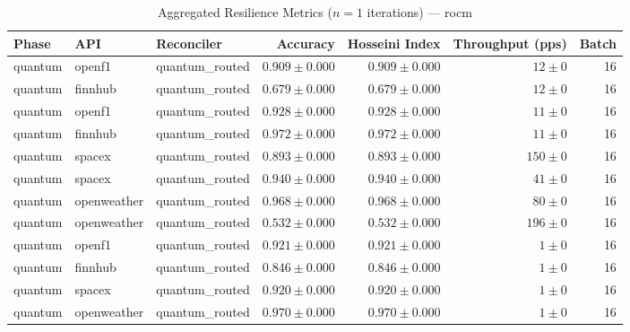 
\begin{table}[htbp]
\caption{Aggregated Resilience Metrics ($n=1$ iterations) --- rocm}
\begin{tabular}{l l l r r r r}
\hline
Phase & API & Reconciler & Accuracy & Hosseini Index & Throughput (pps) & Batch \\
\hline
quantum & openf1 & quantum\_routed & $0.909\pm0.000$ & $0.909\pm0.000$ & $12\pm0$ & 16 \\
quantum & finnhub & quantum\_routed & $0.679\pm0.000$ & $0.679\pm0.000$ & $12\pm0$ & 16 \\
quantum & openf1 & quantum\_routed & $0.928\pm0.000$ & $0.928\pm0.000$ & $11\pm0$ & 16 \\
quantum & finnhub & quantum\_routed & $0.972\pm0.000$ & $0.972\pm0.000$ & $11\pm0$ & 16 \\
quantum & spacex & quantum\_routed & $0.893\pm0.000$ & $0.893\pm0.000$ & $150\pm0$ & 16 \\
quantum & spacex & quantum\_routed & $0.940\pm0.000$ & $0.940\pm0.000$ & $41\pm0$ & 16 \\
quantum & openweather & quantum\_routed & $0.968\pm0.000$ & $0.968\pm0.000$ & $80\pm0$ & 16 \\
quantum & openweather & quantum\_routed & $0.532\pm0.000$ & $0.532\pm0.000$ & $196\pm0$ & 16 \\
quantum & openf1 & quantum\_routed & $0.921\pm0.000$ & $0.921\pm0.000$ & $1\pm0$ & 16 \\
quantum & finnhub & quantum\_routed & $0.846\pm0.000$ & $0.846\pm0.000$ & $1\pm0$ & 16 \\
quantum & spacex & quantum\_routed & $0.920\pm0.000$ & $0.920\pm0.000$ & $1\pm0$ & 16 \\
quantum & openweather & quantum\_routed & $0.970\pm0.000$ & $0.970\pm0.000$ & $1\pm0$ & 16 \\
\hline
\end{tabular}
\end{table}

